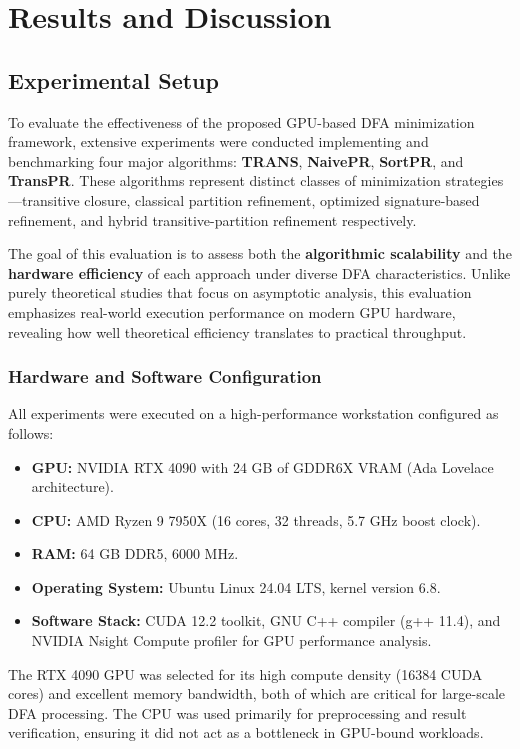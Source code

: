 \chapter{Results and Discussion}
\label{chap:results_discussion}

\section{Experimental Setup}

To evaluate the effectiveness of the proposed GPU-based DFA minimization framework, extensive experiments were conducted implementing and benchmarking four major algorithms: \textbf{TRANS}, \textbf{NaivePR}, \textbf{SortPR}, and \textbf{TransPR}. These algorithms represent distinct classes of minimization strategies—transitive closure, classical partition refinement, optimized signature-based refinement, and hybrid transitive-partition refinement respectively. 

The goal of this evaluation is to assess both the \textbf{algorithmic scalability} and the \textbf{hardware efficiency} of each approach under diverse DFA characteristics. Unlike purely theoretical studies that focus on asymptotic analysis, this evaluation emphasizes real-world execution performance on modern GPU hardware, revealing how well theoretical efficiency translates to practical throughput.

\subsection{Hardware and Software Configuration}

All experiments were executed on a high-performance workstation configured as follows:
\begin{itemize}
  \item \textbf{GPU:} NVIDIA RTX 4090 with 24 GB of GDDR6X VRAM (Ada Lovelace architecture).
  \item \textbf{CPU:} AMD Ryzen 9 7950X (16 cores, 32 threads, 5.7 GHz boost clock).
  \item \textbf{RAM:} 64 GB DDR5, 6000 MHz.
  \item \textbf{Operating System:} Ubuntu Linux 24.04 LTS, kernel version 6.8.
  \item \textbf{Software Stack:} CUDA 12.2 toolkit, GNU C++ compiler (g++ 11.4), and NVIDIA Nsight Compute profiler for GPU performance analysis.
\end{itemize}

The RTX 4090 GPU was selected for its high compute density (16384 CUDA cores) and excellent memory bandwidth, both of which are critical for large-scale DFA processing. The CPU was used primarily for preprocessing and result verification, ensuring it did not act as a bottleneck in GPU-bound workloads.

